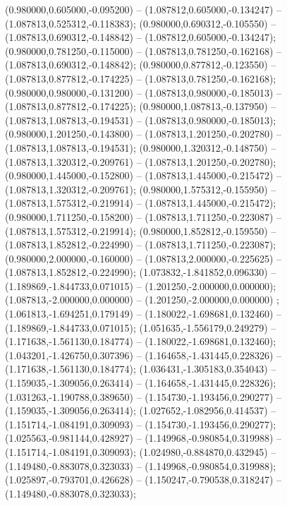  (0.980000,0.605000,-0.095200) -- (1.087812,0.605000,-0.134247) -- (1.087813,0.525312,-0.118383);
 (0.980000,0.690312,-0.105550) -- (1.087813,0.690312,-0.148842) -- (1.087812,0.605000,-0.134247);
 (0.980000,0.781250,-0.115000) -- (1.087813,0.781250,-0.162168) -- (1.087813,0.690312,-0.148842);
 (0.980000,0.877812,-0.123550) -- (1.087813,0.877812,-0.174225) -- (1.087813,0.781250,-0.162168);
 (0.980000,0.980000,-0.131200) -- (1.087813,0.980000,-0.185013) -- (1.087813,0.877812,-0.174225);
 (0.980000,1.087813,-0.137950) -- (1.087813,1.087813,-0.194531) -- (1.087813,0.980000,-0.185013);
 (0.980000,1.201250,-0.143800) -- (1.087813,1.201250,-0.202780) -- (1.087813,1.087813,-0.194531);
 (0.980000,1.320312,-0.148750) -- (1.087813,1.320312,-0.209761) -- (1.087813,1.201250,-0.202780);
 (0.980000,1.445000,-0.152800) -- (1.087813,1.445000,-0.215472) -- (1.087813,1.320312,-0.209761);
 (0.980000,1.575312,-0.155950) -- (1.087813,1.575312,-0.219914) -- (1.087813,1.445000,-0.215472);
 (0.980000,1.711250,-0.158200) -- (1.087813,1.711250,-0.223087) -- (1.087813,1.575312,-0.219914);
 (0.980000,1.852812,-0.159550) -- (1.087813,1.852812,-0.224990) -- (1.087813,1.711250,-0.223087);
 (0.980000,2.000000,-0.160000) -- (1.087813,2.000000,-0.225625) -- (1.087813,1.852812,-0.224990);
 (1.073832,-1.841852,0.096330) -- (1.189869,-1.844733,0.071015) -- (1.201250,-2.000000,0.000000);
 (1.087813,-2.000000,0.000000) -- (1.201250,-2.000000,0.000000) ;
 (1.061813,-1.694251,0.179149) -- (1.180022,-1.698681,0.132460) -- (1.189869,-1.844733,0.071015);
 (1.051635,-1.556179,0.249279) -- (1.171638,-1.561130,0.184774) -- (1.180022,-1.698681,0.132460);
 (1.043201,-1.426750,0.307396) -- (1.164658,-1.431445,0.228326) -- (1.171638,-1.561130,0.184774);
 (1.036431,-1.305183,0.354043) -- (1.159035,-1.309056,0.263414) -- (1.164658,-1.431445,0.228326);
 (1.031263,-1.190788,0.389650) -- (1.154730,-1.193456,0.290277) -- (1.159035,-1.309056,0.263414);
 (1.027652,-1.082956,0.414537) -- (1.151714,-1.084191,0.309093) -- (1.154730,-1.193456,0.290277);
 (1.025563,-0.981144,0.428927) -- (1.149968,-0.980854,0.319988) -- (1.151714,-1.084191,0.309093);
 (1.024980,-0.884870,0.432945) -- (1.149480,-0.883078,0.323033) -- (1.149968,-0.980854,0.319988);
 (1.025897,-0.793701,0.426628) -- (1.150247,-0.790538,0.318247) -- (1.149480,-0.883078,0.323033);
